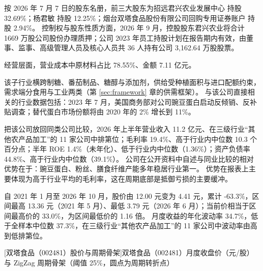  按 2026 年 7 月 7 日的股东名册，前三大股东为招远君兴农业发展中心 持股 32.69\%；杨君敏 持股 12.25\%；烟台双塔食品股份有限公司回购专用证券账户 持股 2.94\%。 控制权与股东性质方面，2026 年 9 月，控股股东君兴农业将合计 1669 万股公司股份办理质押；公司 2023 年员工持股计划在报告期内有效，由董事、监事、高级管理人员及核心人员共 36 人持有公司 3,162.64 万股股票。

 经营层面，营业成本中原材料占比 78.55\%、金额 7.11 亿元。

 该子行业横跨制糖、番茄制品、糖醇与添加剂，供给受种植面积与进口配额约束，需求端分食用与工业两类（第 \ref{sec:framework} 章的供需框架）。 与该公司直接相关的行业数据包括：2023 年 7 月，美国商务部对公司豌豆蛋白启动反倾销、反补贴调查；替代蛋白市场份额将由 2020 年的 2\% 增长到 11\%。

 把该公司放回同类公司比较，2026 年上半年营业收入 11.2 亿元、在三级行业“其他农产品加工”的 11 家公司中排第位；毛利率 19.4\%、高于行业内中位数 10.3 个百分点；半年 ROE 1.4\%（未年化）、低于行业内中位数（1.36\%）；资产负债率 44.8\%、高于行业内中位数（39.1\%）。 公司在公开资料中自述与同业比较的相对优势在于：豌豆蛋白、粉丝、膳食纤维产能多年稳居行业第一。 优势在报表上主要体现为高于行业平均的毛利率，这在周期底部是抵御亏损的主要缓冲。

 自 2021 年 1 月至 2026 年 10 月，股价由 12.00 元变为 4.41 元，累计 -63.3\%，区间最高 13.36 元（2021 年 5 月）、最低 3.79 元（2026 年 6 月）；当前价相当于区间最高价的 33.0\%，为区间最低价的 1.16 倍。 月度收益的年化波动率 34.7\%，低于全样本中位数 37.3\%，在三级行业“其他农产品加工”的 11 家公司中波动率由高到低排第位。

\begin{center}
\begin{minipage}{\textwidth}\centering
{}

[双塔食品（002481）股价与周期骨架]{双塔食品（002481）月度收盘价（元/股）与 ZigZag 周期骨架（阈值 25\%，圆点为周期转折点）}
\end{minipage}
\end{center}

